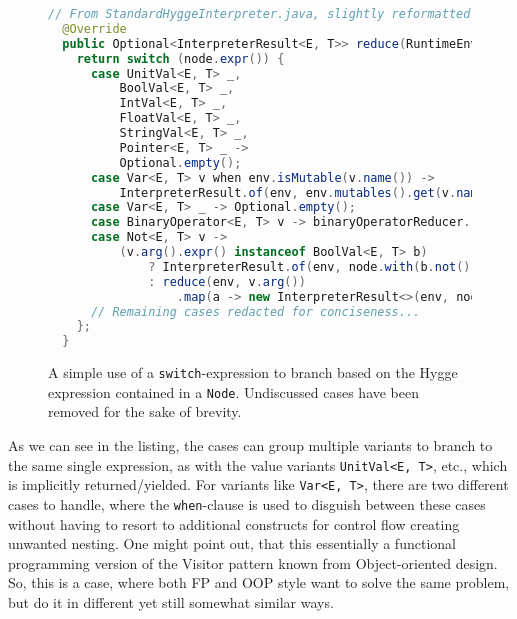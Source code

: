 \begin{figure}[H]
\centering
\begin{lstlisting}[language=Java]
  // From StandardHyggeInterpreter.java, slightly reformatted
  @Override
  public Optional<InterpreterResult<E, T>> reduce(RuntimeEnvironment<E, T> env, Node<E, T> node) {
    return switch (node.expr()) {
      case UnitVal<E, T> _,
          BoolVal<E, T> _,
          IntVal<E, T> _,
          FloatVal<E, T> _,
          StringVal<E, T> _,
          Pointer<E, T> _ ->
          Optional.empty();
      case Var<E, T> v when env.isMutable(v.name()) ->
          InterpreterResult.of(env, env.mutables().get(v.name()));
      case Var<E, T> _ -> Optional.empty();
      case BinaryOperator<E, T> v -> binaryOperatorReducer.reduce(this, env, node, v);
      case Not<E, T> v ->
          (v.arg().expr() instanceof BoolVal<E, T> b)
              ? InterpreterResult.of(env, node.with(b.not()))
              : reduce(env, v.arg())
                  .map(a -> new InterpreterResult<>(env, node.with(new Not<>(a.node()))));
      // Remaining cases redacted for conciseness...
    };
  }
\end{lstlisting}
\caption{A simple use of a \texttt{switch}-expression to branch based on the Hygge expression contained in a \texttt{Node}. Undiscussed cases have been removed for the sake of brevity.}
\label{fig:switch_expression_values}
\end{figure}

As we can see in the listing, the cases can group multiple variants to branch to the same single expression, as with
the value variants \texttt{UnitVal<E, T>}, etc., which is implicitly returned/yielded. For variants like \texttt{Var<E, T>}, there are
two different cases to handle, where the \texttt{when}-clause is used to disguish between these cases without having to resort to
additional constructs for control flow creating unwanted nesting. One might point out, that this essentially a functional programming
version of the Visitor pattern known from Object-oriented design. So, this is a case, where both FP and OOP style want to solve the
same problem, but do it in different yet still somewhat similar ways.

